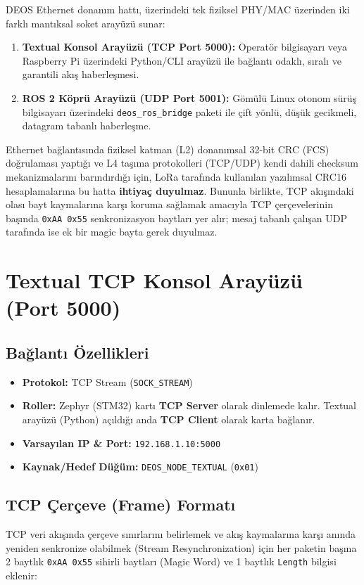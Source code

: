 \documentclass[a4paper,10pt]{article}
\newcommand{\hex}[1]{\texttt{0x#1}}
\newcommand{\code}[1]{\texttt{#1}}
\begin{document}
DEOS Ethernet donanım hattı, üzerindeki tek fiziksel PHY/MAC üzerinden iki farklı mantıksal soket arayüzü sunar:
\begin{enumerate}
    \item \textbf{Textual Konsol Arayüzü (TCP Port 5000):} Operatör bilgisayarı veya Raspberry Pi üzerindeki Python/CLI arayüzü ile bağlantı odaklı, sıralı ve garantili akış haberleşmesi.
    \item \textbf{ROS 2 Köprü Arayüzü (UDP Port 5001):} Gömülü Linux otonom sürüş bilgisayarı üzerindeki \code{deos\_ros\_bridge} paketi ile çift yönlü, düşük gecikmeli, datagram tabanlı haberleşme.
\end{enumerate}

Ethernet bağlantısında fiziksel katman (L2) donanımsal 32-bit CRC (FCS) doğrulaması yaptığı ve L4 taşıma protokolleri (TCP/UDP) kendi dahili checksum mekanizmalarını barındırdığı için, LoRa tarafında kullanılan yazılımsal CRC16 hesaplamalarına bu hatta \textbf{ihtiyaç duyulmaz}. Bununla birlikte, TCP akışındaki olası bayt kaymalarına karşı koruma sağlamak amacıyla TCP çerçevelerinin başında \code{0xAA 0x55} senkronizasyon baytları yer alır; mesaj tabanlı çalışan UDP tarafında ise ek bir magic bayta gerek duyulmaz.

\section{Textual TCP Konsol Arayüzü (Port 5000)}

\subsection{Bağlantı Özellikleri}
\begin{itemize}
    \item \textbf{Protokol:} TCP Stream (\code{SOCK\_STREAM})
    \item \textbf{Roller:} Zephyr (STM32) kartı \textbf{TCP Server} olarak dinlemede kalır. Textual arayüzü (Python) açıldığı anda \textbf{TCP Client} olarak karta bağlanır.
    \item \textbf{Varsayılan IP \& Port:} \code{192.168.1.10:5000}
    \item \textbf{Kaynak/Hedef Düğüm:} \code{DEOS\_NODE\_TEXTUAL} (\hex{01})
\end{itemize}

\subsection{TCP Çerçeve (Frame) Formatı}
TCP veri akışında çerçeve sınırlarını belirlemek ve akış kaymalarına karşı anında yeniden senkronize olabilmek (Stream Resynchronization) için her paketin başına 2 baytlık \code{0xAA 0x55} sihirli baytları (Magic Word) ve 1 baytlık \code{Length} bilgisi eklenir:
\end{document}
